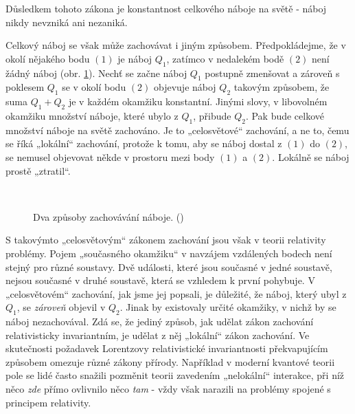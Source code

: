     Důsledkem tohoto zákona je konstantnost celkového náboje na světě - náboj nikdy nevzniká ani
    nezaniká.
    
    Celkový náboj se však může zachovávat i jiným způsobem. Předpokládejme, že v okolí nějakého bodu
    \((1)\) je náboj \(Q_1\), zatímco v nedalekém bodě \((2)\) není žádný náboj (obr.
    \ref{fyz:fig609}). Nechť se začne náboj \(Q_1\) postupně zmenšovat a zároveň s poklesem \(Q_1\)
    se v okolí bodu \((2)\) objevuje náboj \(Q_2\) takovým způsobem, že suma \(Q_1 + Q_2\) je v
    každém okamžiku konstantní. Jinými slovy, v libovolném okamžiku množství náboje, které ubylo z
    \(Q_1\), přibude \(Q_2\). Pak bude celkové množství náboje na světě zachováno. Je to
    „celosvětové“ zachování, a ne to, čemu se říká „lokální“ zachování, protože k tomu, aby se náboj
    dostal z \((1)\) do \((2)\), se nemusel objevovat někde v prostoru mezi body \((1)\) a \((2)\).
    Lokálně se náboj prostě „ztratil“.

    \begin{figure}[ht!]   %
      \centering
        {}  \\
        {} 
      \caption{Dva způsoby zachovávání náboje. (\cite[s.~493]{Feynman02})}
      \label{fyz:fig609}
    \end{figure}

    S takovýmto „celosvětovým“ zákonem zachování jsou však v teorii relativity problémy. Pojem
    „současného okamžiku“ v navzájem vzdálených bodech není stejný pro různé soustavy. Dvě události,
    které jsou současné v jedné soustavě, nejsou současné v druhé soustavě, která se vzhledem k
    první pohybuje. V „celosvětovém“ zachování, jak jsme jej popsali, je důležité, že náboj, který
    ubyl z \(Q_1\), se \emph{zároveň} objevil v \(Q_2\). Jinak by existovaly určité okamžiky, v
    nichž by se náboj nezachovával. Zdá se, že jediný způsob, jak udělat zákon zachování
    relativisticky invariantním, je udělat z něj „lokální“ zákon zachování. Ve skutečnosti požadavek
    Lorentzovy relativistické invariantnosti překvapujícím způsobem omezuje různé zákony přírody.
    Například v moderní kvantové teorii pole se lidé často snažili pozměnit teorii zavedením
    „nelokální“ interakce, při níž něco \emph{zde} přímo ovlivnilo něco \emph{tam} - vždy však
    narazili na problémy spojené s principem relativity.

